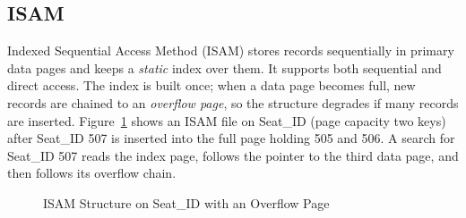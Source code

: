 \documentclass[12pt,a4paper]{article}
\begin{document}
\subsection{ISAM}
Indexed Sequential Access Method (ISAM) stores records sequentially in primary data pages and keeps a
\emph{static} index over them. It supports both sequential and direct access. The index is built once; when
a data page becomes full, new records are chained to an \emph{overflow page}, so the structure degrades if
many records are inserted. Figure~\ref{fig:isam} shows an ISAM file on Seat_ID (page capacity two keys)
after Seat_ID 507 is inserted into the full page holding 505 and 506. A search for Seat_ID 507 reads the
index page, follows the pointer to the third data page, and then follows its overflow chain.
\begin{figure}[H]
\centering
{}
\caption{ISAM Structure on Seat\_ID with an Overflow Page}\label{fig:isam}
\end{figure}
\end{document}
